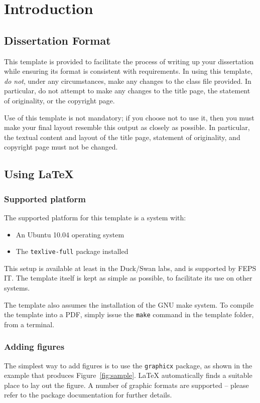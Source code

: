 
\chapter{Introduction}

\section{Dissertation Format}
This template is provided to facilitate the process of writing up your
dissertation while ensuring its format is consistent with requirements.
In using this template, \emph{do not}, under any circumstances, make any
changes to the class file provided.
In particular, do not attempt to make any changes to the title page, the
statement of originality, or the copyright page.

Use of this template is not mandatory; if you choose not to use it, then you
must make your final layout resemble this output as closely as possible.
In particular, the textual content and layout of the title page, statement of
originality, and copyright page must not be changed.

\section{Using \LaTeX{}}

\subsection{Supported platform}
The supported platform for this template is a system with:
\begin{itemize}
\item An Ubuntu 10.04 operating system
\item The \verb|texlive-full| package installed
\end{itemize}
This setup is available at least in the Duck/Swan labs, and is supported by
FEPS IT.
The template itself is kept as simple as possible, to facilitate its use on
other systems.

The template also assumes the installation of the GNU make system.
To compile the template into a PDF, simply issue the \verb|make| command
in the template folder, from a terminal.

\subsection{Adding figures}
The simplest way to add figures is to use the \verb|graphicx| package, as shown
in the example that produces Figure~\ref{fig:sample}.
\LaTeX{} automatically finds a suitable place to lay out the figure.
A number of graphic formats are supported -- please refer to the package
documentation for further details.

